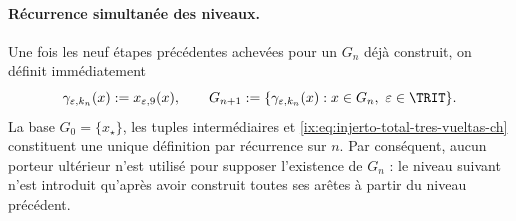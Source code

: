 \paragraph{Récurrence simultanée des niveaux.}
Une fois les neuf étapes précédentes achevées pour un \(G_n\) déjà construit,
on définit immédiatement
\begin{equation}
 \gamma_{\varepsilon,k_n}(x):=x_{\varepsilon,9}(x),\qquad
 G_{n+1}:=\{\gamma_{\varepsilon,k_n}(x):
       x\in G_n,\ \varepsilon\in\TRIT\}.
 \label{ix:eq:injerto-total-tres-vueltas-ch}
\end{equation}
\label{ix:eq:tres-vueltas-tpk-ch}
La base \(G_0=\{x_\star\}\), les tuples intermédiaires et
\eqref{ix:eq:injerto-total-tres-vueltas-ch} constituent une unique définition par
récurrence sur \(n\). Par conséquent, aucun porteur ultérieur n’est utilisé pour
supposer l’existence de \(G_n\) : le niveau suivant n’est introduit
qu’après avoir construit toutes ses arêtes à partir du niveau précédent.

